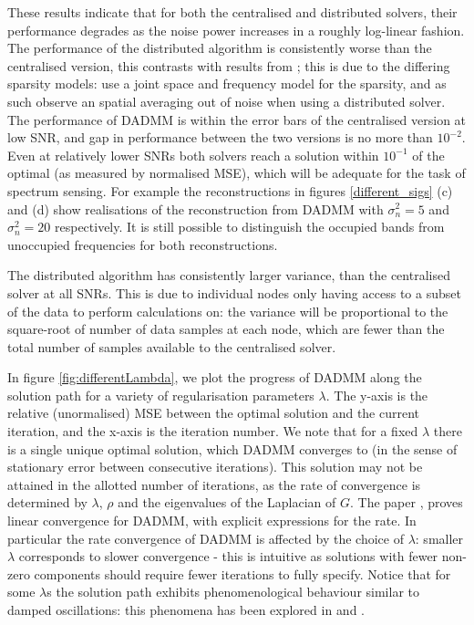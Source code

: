 These results indicate that for both the centralised and distributed solvers, their performance degrades as the noise power increases in a roughly log-linear fashion. The performance of the distributed algorithm is consistently worse than the centralised version, this contrasts with results from \cite{bazerque2008}; this is due to the differing sparsity models: \cite{bazerque2008} use a joint space and frequency model for the sparsity, and as such observe an spatial averaging out of noise when using a distributed solver. The performance of DADMM is within the error bars of the centralised version at low SNR, and gap in performance between the two versions is no more than \(10^{-2}\). Even at relatively lower SNRs both solvers reach a solution within \(10^{-1}\) of the optimal (as measured by normalised MSE), which will be adequate for the task of spectrum sensing. For example the reconstructions in figures \eqref{different_sigs} (c) and (d) show realisations of the reconstruction from DADMM with \(\sigma^2_n = 5\) and \(\sigma^2_n = 20\) respectively. It is still possible to distinguish the occupied bands from unoccupied frequencies for both reconstructions.

The distributed algorithm has consistently larger variance, than the centralised solver at all SNRs. This is due to individual nodes only having access to a subset of the data to perform calculations on: the variance will be proportional to the square-root of number of data samples at each node, which are fewer than the total number of samples available to the centralised solver. 

In figure \eqref{fig:differentLambda}, we plot the progress of DADMM along the solution path for a variety of regularisation parameters \(\lambda\). The y-axis is the relative (unormalised) MSE between the optimal solution and the current iteration, and the x-axis is the iteration number. We note that for a fixed \(\lambda\) there is a single unique optimal solution, which DADMM converges to (in the sense of stationary error between consecutive iterations). This solution may not be attained in the allotted number of iterations, as the rate of convergence is determined by \(\lambda\), \(\rho\) and the eigenvalues of the Laplacian of \(G\). The paper \cite{shi2014linear}, proves linear convergence for DADMM, with explicit expressions for the rate. In particular the rate convergence of DADMM is affected by the choice of \(\lambda\): smaller \(\lambda\) corresponds to slower convergence - this is intuitive as solutions with fewer non-zero components should require fewer iterations to fully specify. Notice that for some \(\lambda\)s the solution path exhibits phenomenological  behaviour similar to damped oscillations: this phenomena has been explored in \cite{nishihara2015general} and \cite{su2014differential}.  


